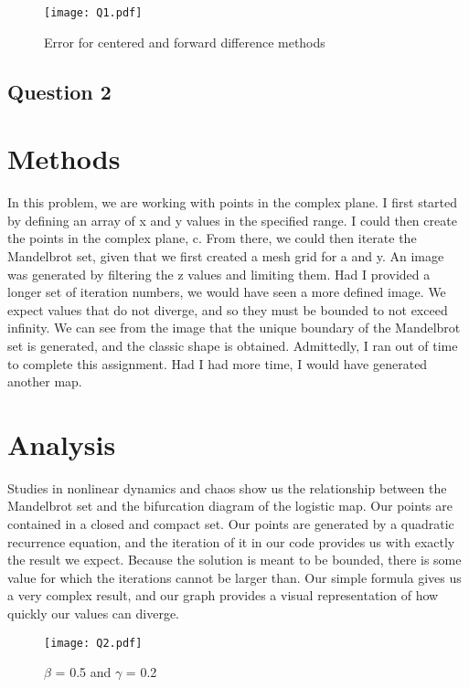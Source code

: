 \documentclass{article}
\begin{document}
\begin{figure}[htp]
    \centering
    \texttt{[image: Q1.pdf]}
    \caption{Error for centered and forward difference methods}
    \label{fig:Q1}
\end{figure}

\newpage

\begin{center}
    \section*{Question 2}
\end{center}

\section*{Methods}

In this problem, we are working with points in the complex plane. I first started by defining an array of x and y values in the specified range. I could then create the points in the complex plane, c. From there, we could then iterate the Mandelbrot set, given that we first created a mesh grid for a and y. An image was generated by filtering the z values and limiting them. Had I provided a longer set of iteration numbers, we would have seen a more defined image. We expect values that do not diverge, and so they must be bounded to not exceed infinity. We can see from the image that the unique boundary of the Mandelbrot set is generated, and the classic shape is obtained. Admittedly, I ran out of time to complete this assignment. Had I had more time, I would have generated another map.

\section*{Analysis}

Studies in nonlinear dynamics and chaos show us the relationship between the Mandelbrot set and the bifurcation diagram of the logistic map. Our points are contained in a closed and compact set. Our points are generated by a quadratic recurrence equation, and the iteration of it in our code provides us with exactly the result we expect. Because the solution is meant to be bounded, there is some value for which the iterations cannot be larger than. Our simple formula gives us a very complex result, and our graph provides a visual representation of how quickly our values can diverge.

\begin{figure}[htp]
    \centering
    \texttt{[image: Q2.pdf]}
    \caption{$\beta$ = 0.5 and $\gamma$ = 0.2}
    \label{fig:Q2}
\end{figure}
\end{document}
